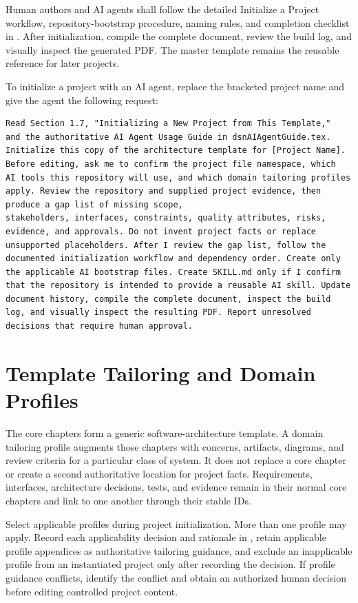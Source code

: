 Human authors and AI agents shall follow the detailed Initialize a Project
workflow, repository-bootstrap procedure, naming rules, and completion
checklist in . After initialization, compile the
complete document, review the build log, and visually inspect the generated
PDF. The master template remains the reusable reference for later projects.

To initialize a project with an AI agent, replace the bracketed project name
and give the agent the following request:

\begin{verbatim}
Read Section 1.7, "Initializing a New Project from This Template,"
and the authoritative AI Agent Usage Guide in dsnAIAgentGuide.tex.
Initialize this copy of the architecture template for [Project Name].
Before editing, ask me to confirm the project file namespace, which
AI tools this repository will use, and which domain tailoring profiles
apply. Review the repository and supplied project evidence, then
produce a gap list of missing scope,
stakeholders, interfaces, constraints, quality attributes, risks,
evidence, and approvals. Do not invent project facts or replace
unsupported placeholders. After I review the gap list, follow the
documented initialization workflow and dependency order. Create only
the applicable AI bootstrap files. Create SKILL.md only if I confirm
that the repository is intended to provide a reusable AI skill. Update
document history, compile the complete document, inspect the build
log, and visually inspect the resulting PDF. Report unresolved
decisions that require human approval.
\end{verbatim}

\section{Template Tailoring and Domain Profiles}
\label{Section:DomainProfiles}
The core chapters form a generic software-architecture template. A domain
tailoring profile augments those chapters with concerns, artifacts, diagrams,
and review criteria for a particular class of system. It does not replace a
core chapter or create a second authoritative location for project facts.
Requirements, interfaces, architecture decisions, tests, and evidence remain
in their normal core chapters and link to one another through their stable IDs.

Select applicable profiles during project initialization. More than one
profile may apply. Record each applicability decision and rationale in
, retain applicable profile appendices as
authoritative tailoring guidance, and exclude an inapplicable profile from an
instantiated project only after recording the decision. If profile guidance
conflicts, identify the conflict and obtain an authorized human decision before
editing controlled project content.

